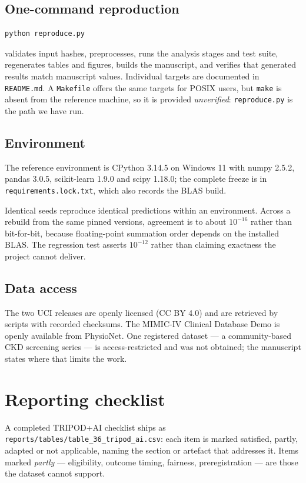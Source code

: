 \documentclass[conference]{IEEEtran}
\begin{document}
\subsection{One-command reproduction}

\begin{verbatim}
python reproduce.py
\end{verbatim}

validates input hashes, preprocesses, runs the analysis stages and test
suite, regenerates tables and figures, builds the manuscript, and verifies
that generated results match manuscript values. Individual targets are
documented in \texttt{README.md}. A \texttt{Makefile} offers the same
targets for POSIX users, but \texttt{make} is absent from the reference
machine, so it is provided \emph{unverified}: \texttt{reproduce.py} is the
path we have run.

\subsection{Environment}

The reference environment is CPython 3.14.5 on Windows 11 with numpy 2.5.2,
pandas 3.0.5, scikit-learn 1.9.0 and scipy 1.18.0; the complete freeze is in
\texttt{requirements.lock.txt}, which also records the BLAS build.

Identical seeds reproduce identical predictions within an environment. Across
a rebuild from the same pinned versions, agreement is to about $10^{-16}$
rather than bit-for-bit, because floating-point summation order depends on
the installed BLAS. The regression test asserts $10^{-12}$ rather than
claiming exactness the project cannot deliver.

\subsection{Data access}

The two UCI releases are openly licensed (CC BY 4.0) and are retrieved by
scripts with recorded checksums. The MIMIC-IV Clinical Database Demo is
openly available from PhysioNet. One registered dataset --- a community-based
CKD screening series --- is access-restricted and was not obtained; the
manuscript states where that limits the work.

\section{Reporting checklist}

A completed TRIPOD+AI checklist ships as
\texttt{reports/tables/table\_36\_tripod\_ai.csv}: each
item is marked satisfied, partly, adapted or not applicable, naming the
section or artefact that addresses it. Items marked \emph{partly} ---
eligibility, outcome timing, fairness, preregistration --- are those the
dataset cannot support.
\end{document}
